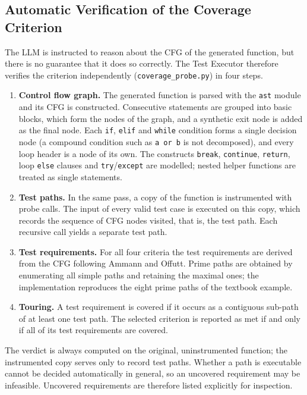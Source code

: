 \documentclass[11pt, a4paper]{article}
\begin{document}
\subsection{Automatic Verification of the Coverage Criterion}
\label{sec:verification}

The LLM is instructed to reason about the CFG of the generated function, but there is no guarantee that it does so correctly. The Test Executor therefore verifies the criterion independently (\texttt{coverage\_probe.py}) in four steps.
\begin{enumerate}
    \item \textbf{Control flow graph.} The generated function is parsed with the \texttt{ast} module and its CFG is constructed. Consecutive statements are grouped into basic blocks, which form the nodes of the graph, and a synthetic exit node is added as the final node. Each \texttt{if}, \texttt{elif} and \texttt{while} condition forms a single decision node (a compound condition such as \texttt{a or b} is not decomposed), and every loop header is a node of its own. The constructs \texttt{break}, \texttt{continue}, \texttt{return}, loop \texttt{else} clauses and \texttt{try}/\texttt{except} are modelled; nested helper functions are treated as single statements.
    \item \textbf{Test paths.} In the same pass, a copy of the function is instrumented with probe calls. The input of every valid test case is executed on this copy, which records the sequence of CFG nodes visited, that is, the test path. Each recursive call yields a separate test path.
    \item \textbf{Test requirements.} For all four criteria the test requirements are derived from the CFG following Ammann and Offutt. Prime paths are obtained by enumerating all simple paths and retaining the maximal ones; the implementation reproduces the eight prime paths of the textbook example.
    \item \textbf{Touring.} A test requirement is covered if it occurs as a contiguous sub-path of at least one test path. The selected criterion is reported as met if and only if all of its test requirements are covered.
\end{enumerate}
The verdict is always computed on the original, uninstrumented function; the instrumented copy serves only to record test paths. Whether a path is executable cannot be decided automatically in general, so an uncovered requirement may be infeasible. Uncovered requirements are therefore listed explicitly for inspection.
\end{document}

